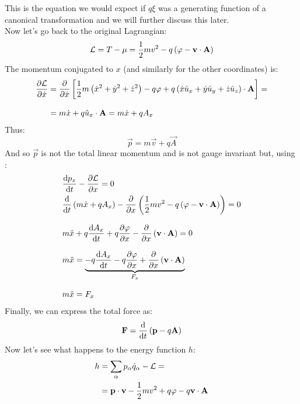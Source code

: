 This is the equation we would expect if $q\xi$ was a generating function of a canonical transformation and we will further discuss this later.\\
Now let's go back to the original Lagrangian:
\begin{equation}
  \mathcal{L} = T - \mu = \dfrac{1}{2}mv^2 - q\left(\varphi - \vb{v} \cdot \vb{A}\right)
\end{equation}
The momentum conjugated to $x$ (and similarly for the other coordinates) is:
\begin{equation}
  \begin{split}
    \pdv{\lagr}{\dot{x}} &= \pdv{}{\dot{x}}\left[\dfrac{1}{2}m\brackets{\dot{x}^2 + \dot{y}^2 + \dot{z}^2} - q\potE + q\brackets{\dot{x} \hat{u}_x + \dot{y} \hat{u}_y + \dot{z} \hat{u}_z} \cdot \vec{A}\right] =\\[8pt]
    &= m\dot{x} + q\hat{u}_x \cdot \vec{A} = m\dot{x} + qA_x
  \end{split}
\end{equation}
Thus:
\begin{equation}
  \vec{p} = m\vec{v} + q\vec{A}
\end{equation}
And so $\vec{p}$ is not the total linear momentum and is not gauge invariant but, using \eleref :
\begin{equation}
  \begin{split}
    &\dv{p_x}{t} - \pdv{\lagr}{x} = 0\\
    &\dv{}{t}\brackets{m\dot{x} + qA_x} - \pdv{}{x}\brackets{\dfrac{1}{2}mv^2 - q\brackets{\potE - \vec{v} \cdot \vec{A}}} = 0\\[8pt]
    &m\ddot{x} +q\dv{A_x}{t} + q\pdv{\potE}{x} - \pdv{}{x}\brackets{\vec{v} \cdot \vec{A}} = 0\\[8pt]
    &m\ddot{x} = \underbrace{-q\dv{A_x}{t} - q\pdv{\potE}{x} + \pdv{}{x}\brackets{\vec{v} \cdot \vec{A}}}_{F_x}\\[8pt]
    &m\ddot{x} = F_x
  \end{split}
\end{equation}
Finally, we can express the total force as:
\begin{equation}
  \vec{F} = \dv{}{t}\brackets{\vec{p} - q\vec{A}}
\end{equation}
Now let's see what happens to the energy function $h$:
\begin{equation}
  \begin{split}
    h &= \displaystyle\sum_{\alpha}p_{\alpha}\dot{q}_{\alpha} - \mathcal{L} =\\
    &= \vb{p} \cdot \vb{v} - \dfrac{1}{2}mv^2 +q\varphi - q\vb{v} \cdot \vb{A}
  \end{split}
\end{equation}
